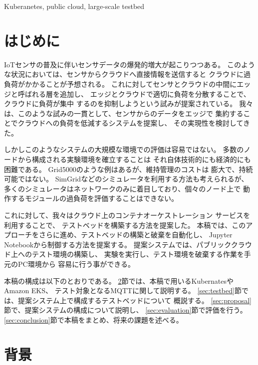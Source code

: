 \documentclass[submit,techrep]{ipsj}
\newcommand{\kbs}{Kubernates}
\begin{document}
\begin{ekeyword}
  Kuberanetes, public cloud, large-scale testbed
\end{ekeyword}

\maketitle

\section{はじめに}

IoTセンサの普及に伴いセンサデータの爆発的増大が起こりつつある。
このような状況においては、センサからクラウドへ直接情報を送信すると
クラウドに過負荷がかかることが予想される。
これに対してセンサとクラウドの中間にエッジと呼ばれる層を追加し、
エッジとクラウドで適切に負荷を分散することで、クラウドに負荷が集中
するのを抑制しようという試みが提案されている。
我々は、このような試みの一貫として、センサからのデータをエッジで
集約することでクラウドへの負荷を低減するシステムを提案し、
その実現性を検討してきた\cite{tou-os}。

しかしこのようなシステムの大規模な環境での評価は容易ではない。
多数のノードから構成される実験環境を確立することは
それ自体技術的にも経済的にも困難である。
Grid5000\cite{grid5000}のような例はあるが、維持管理のコストは
膨大で、持続可能ではない。
%
SimGrid\cite{simgrid}などのシミュレータを利用する方法も考えられるが、
多くのシミュレータはネットワークのみに着目しており、個々のノード上で
動作するモジュールの過負荷を評価することはできない。

これに対して、我々はクラウド上のコンテナオーケストレーション
サービスを利用することで、
テストベッドを構築する方法を提案した\cite{tou-hpc}。
本稿では、このアプローチをさらに進め、テストベッドの構築と破棄を自動化し、
Jupyter Notebookから制御する方法を提案する。
提案システムでは、パブリッククラウド上へのテスト環境の構築し、
実験を実行し、テスト環境を破棄する作業を手元のPC環境から
容易に行う事ができる。

本稿の構成は以下のとおりである。
\ref{sec:background}節では、本稿で用いる\kbs やAmazon EKS、
テスト対象となるMQTTに関して説明する。
\ref{sec:testbed}節では、提案システム上で構成するテストベッドについて
概説する。
\ref{sec:proposal}節で、提案システムの構成について説明し、
\ref{sec:evaluation}節で評価を行う。
\ref{sec:conclusion}節で本稿をまとめ、将来の課題を述べる。

\section{背景}\label{sec:background}
\end{document}
